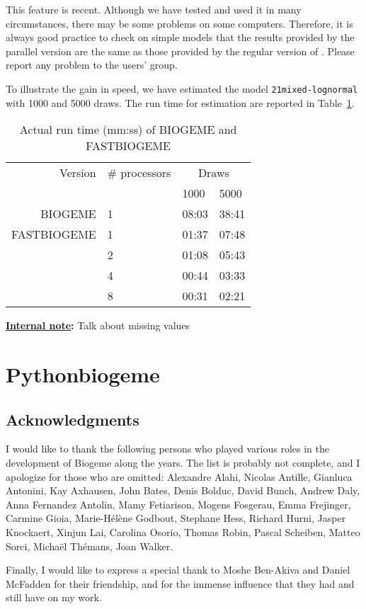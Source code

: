\documentclass[12pt]{memoir}
\newcommand{\note}[1]{
\begin{framed}{}%
\textbf{\underline{Internal note}:} #1
\end{framed}}
\begin{document}
This feature is recent. Although we have tested and used it in many
circumstances, there may be some problems on some
computers. Therefore, it is always good practice to check  on simple
models that the results provided by the parallel version are the same
as those provided by the regular version of \BIOGEME . Please report
any problem to the users' group. 

To illustrate the gain in speed, we have estimated the model \texttt{21mixed-lognormal} with 1000 and 5000 draws. The run time for estimation are reported in Table~\ref{tab:runtime}. 

\begin{table}[htbf]
\begin{center}
\begin{tabular}{rlll}
Version & \# processors & \multicolumn{2}{c}{Draws} \\
\cline{3-4}
   &    &  1000 & 5000 \\
\hline
BIOGEME & 1  & 08:03 & 38:41 \\
FASTBIOGEME & 1 & 01:37 & 07:48 \\
            & 2 & 01:08 & 05:43\\
            & 4 & 00:44 & 03:33 \\ 
            & 8 & 00:31 & 02:21\\
\end{tabular}

\end{center}
\caption{\label{tab:runtime}Actual run time (mm:ss) of BIOGEME  and FASTBIOGEME}
\end{table}





\note{Talk about missing values}
\chapter{Pythonbiogeme}




\section{Acknowledgments}

I would like to thank the following persons who played various roles in the development of Biogeme along the years. The list is probably not complete, and I apologize for those who are omitted: 
Alexandre Alahi, 
Nicolas Antille, 
Gianluca Antonini, 
Kay Axhausen,
John Bates, 
Denis Bolduc,
David Bunch, 
Andrew Daly, 
Anna Fernandez Antolin,
Mamy Fetiarison,
Mogens Fosgerau, 
Emma Frejinger,
Carmine Gioia, 
Marie-H\'el\`ene Godbout, 
Stephane Hess, 
Richard Hurni, 
Jasper Knockaert, 
Xinjun Lai,
Carolina Osorio,
Thomas Robin,
Pascal Scheiben,
Matteo Sorci,
Micha\"el Th\'emans, 
Joan Walker.

Finally, I would like to express a special thank to Moshe Ben-Akiva
and Daniel McFadden for their friendship, and for the immense
influence that they had and still have on my work.

\clearpage
\appendix




\clearpage


\printindex
\end{document}
